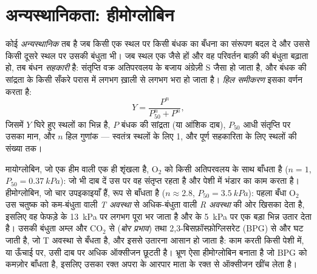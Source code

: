 \section{अन्यस्थानिकता: हीमोग्लोबिन}

\begin{definition}[अन्यस्थानिकता, सहकारिता]\label{def:b1:proteins:allostery}
कोई  \emph{अन्यस्थानिक} तब है जब किसी एक
स्थल पर किसी बंधक का बँधना  का संरूपण बदल दे और उससे किसी दूसरे
स्थल पर उसकी बंधुता भी। जब स्थल एक जैसे हों और वह परिवर्तन बाक़ी की
बंधुता बढ़ाता हो, तब बंधन \emph{सहकारी} है:
संतृप्ति वक्र अतिपरवलय के बजाय अंग्रेज़ी S जैसा हो जाता है, और 
बंधक की सांद्रता के किसी सँकरे परास में लगभग ख़ाली से लगभग भरा हो जाता
है। \emph{हिल समीकरण} इसका वर्णन करता है:
\[
Y = \frac{P^n}{P_{50}^n + P^n},
\]
जिसमें $Y$ घिरे हुए स्थलों का भिन्न है, $P$ बंधक की सांद्रता
(या आंशिक दाब), $P_{50}$ आधी संतृप्ति पर उसका मान, और $n$ हिल गुणांक ---
स्वतंत्र स्थलों के लिए 1, और पूर्ण सहकारिता के लिए स्थलों की संख्या तक।
\end{definition}

\begin{proposition}[हीमोग्लोबिन और मायोग्लोबिन]\label{prop:b1:proteins:hemoglobin}
मायोग्लोबिन, जो एक हीम वाली एक ही शृंखला है, $\mathrm{O_2}$ को किसी
अतिपरवलय के साथ बाँधता है ($n = 1$, $P_{50} = \qty{0.37}{kPa}$):  जो
भी दाब दें उस पर वह संतृप्त रहता है और पेशी में भंडार का काम करता है।
हीमोग्लोबिन, जो चार उपइकाइयाँ हैं,  रूप से बाँधता है ($n \approx 2.8$,
$P_{50} = \qty{3.5}{kPa}$): पहला बँधा $\mathrm{O_2}$ उस
चतुष्क को कम-बंधुता वाली \emph{T अवस्था} से अधिक-बंधुता वाली
\emph{R अवस्था} की ओर खिसका देता है, इसलिए वह फेफड़े के
\qty{13}{kPa} पर लगभग पूरा भर जाता है और  के
\qty{5}{kPa} पर एक बड़ा भिन्न उतार देता है। उसकी बंधुता अम्ल और
$\mathrm{CO_2}$ से (\emph{बोर प्रभाव}) तथा
2,3-बिसफ़ॉस्फ़ोग्लिसरेट (BPG) से और घट जाती है, जो T अवस्था से बँधता है,
और इससे उतारना आसान हो जाता है: काम करती किसी पेशी में, या ऊँचाई पर, उसी
दाब पर अधिक ऑक्सीजन छूटती है। भ्रूण ऐसा हीमोग्लोबिन बनाता है जो BPG को
कमज़ोर बाँधता है, इसलिए उसका रक्त अपरा के आरपार माता के रक्त से ऑक्सीजन
खींच लेता है।
\end{proposition}


